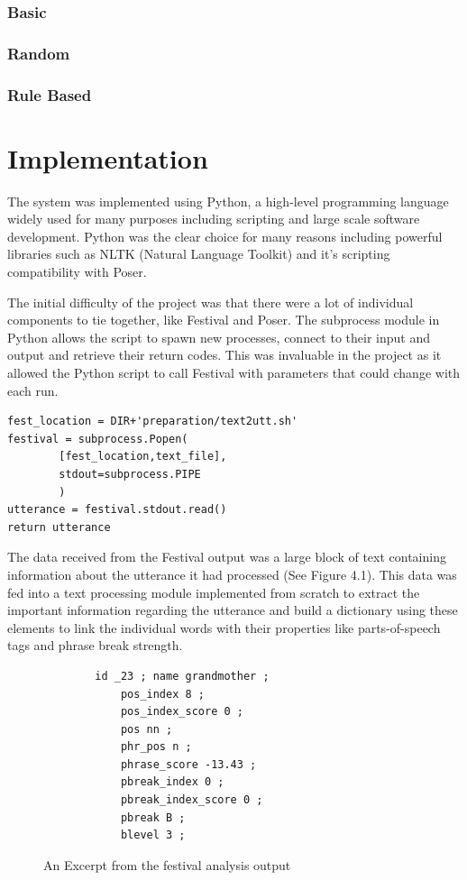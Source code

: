 \documentclass[bsc,frontabs,twoside,singlespacing,parskip]{infthesis}
\begin{document}
\subsection{Basic}

\subsection{Random}

\subsection{Rule Based}

\chapter{Implementation}

The system was implemented using Python, a high-level programming language widely used for many purposes including scripting and large scale software development. Python was the clear choice for many reasons including powerful libraries such as NLTK (Natural Language Toolkit) \cite{nltk} and it's scripting compatibility with Poser. 

The initial difficulty of the project was that there were a lot of individual components to tie together, like Festival and Poser. The subprocess module in Python allows the script to spawn new processes, connect to their input and output and retrieve their return codes. This was invaluable in the project as it allowed the Python script to call Festival with parameters that could change with each run.

\begin{lstlisting}
fest_location = DIR+'preparation/text2utt.sh'
festival = subprocess.Popen(
		[fest_location,text_file], 
		stdout=subprocess.PIPE
		)
utterance = festival.stdout.read()
return utterance
\end{lstlisting}

The data received from the Festival output was a large block of text containing information about the utterance it had processed (See Figure 4.1). This data was fed into a text processing module implemented from scratch to extract the important information regarding the utterance and build a dictionary using these elements to link the individual words with their properties like parts-of-speech tags and phrase break strength.

\begin{figure}
	\begin{lstlisting}
		id _23 ; name grandmother ;
			pos_index 8 ;
			pos_index_score 0 ;
			pos nn ; 
			phr_pos n ; 
			phrase_score -13.43 ; 
			pbreak_index 0 ; 
			pbreak_index_score 0 ; 
			pbreak B ; 
			blevel 3 ; 
	\end{lstlisting}
	\caption{An Excerpt from the festival analysis output}
\end{figure}
\end{document}
